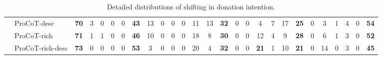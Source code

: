 \begin{table}[ht]
\begin{tabular}{p{1.3cm}l|ccccc|ccccc|ccccc|ccccc|ccccc}
        & ProCoT-desc & \bf{70} & 3 & 0 & 0 & 0 & \bf{43} & 13 & 0 & 0 & 0 & 11 & 13 & \bf{32} & 0 & 0 & 4 & 7 & 17 & \bf{25} & 0 & 3 & 1 & 4 & 0 & \bf{54} \\
        & ProCoT-rich & \bf{71} & 1 & 1 & 0 & 0 & \bf{46} & 10 & 0 & 0 & 0 & 18 & 8 & \bf{30} & 0 & 0 & 12 & 4 & 9 & \bf{28} & 0 & 6 & 1 & 3 & 0 & \bf{52} \\
        & ProCoT-rich-desc & \bf{73} & 0 & 0 & 0 & 0 & \bf{53} & 3 & 0 & 0 & 0 & 20 & 4 & \bf{32} & 0 & 0 & \bf{21} & 1 & 10 & \bf{21} & 0 & 14 & 0 & 3 & 0 & \bf{45} \\
        \bottomrule
    \end{tabular}
    \caption{Detailed distributions of shifting in donation intention.}
    \label{tab:intention-shifts}
\end{table}

\setlength{\tabcolsep}{6pt} %